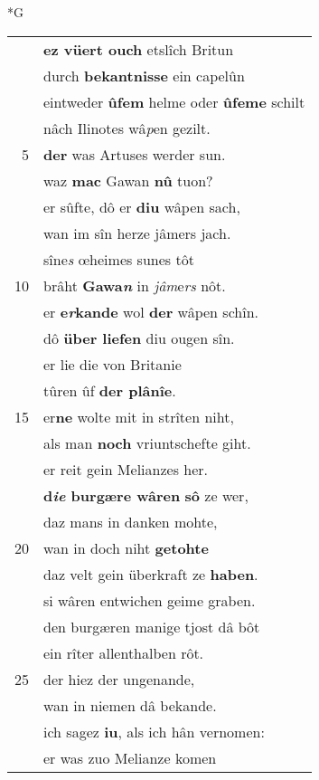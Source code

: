 \documentclass[8pt,a4paper,notitlepage]{article}
\begin{document}
\newpage
\begin{table}[ht]
\begin{minipage}[t]{0.5\linewidth}
\small
\begin{center}*G
\end{center}
\begin{tabular}{rl}
 & \textbf{ez vüert ouch} etslîch Britun\\ 
 & durch \textbf{bekantnisse} ein capelûn\\ 
 & eintweder \textbf{ûfem} helme oder \textbf{ûfeme} schilt\\ 
 & nâch Ilinotes wâ\textit{p}en gezilt.\\ 
5 & \textbf{der} was Artuses werder sun.\\ 
 & waz \textbf{mac} Gawan \textbf{nû} tuon?\\ 
 & er sûfte, dô er \textbf{diu} wâpen sach,\\ 
 & wan im sîn herze jâmers jach.\\ 
 & sîne\textit{s} œheimes sunes tôt\\ 
10 & brâht \textbf{Gawa\textit{n}} in \textit{jâm}e\textit{rs} nôt.\\ 
 & er \textbf{e\textit{r}kande} wol \textbf{der} wâpen schîn.\\ 
 & dô \textbf{über liefen} diu ougen sîn.\\ 
 & er lie die von Britanie\\ 
 & tûren ûf \textbf{der plânîe}.\\ 
15 & er\textbf{ne} wolte mit in strîten niht,\\ 
 & als man \textbf{noch} vriuntschefte giht.\\ 
 & er reit gein Melianzes her.\\ 
 & \textbf{d\textit{ie} burgære wâren} \textbf{sô} ze wer,\\ 
 & daz mans in danken mohte,\\ 
20 & wan in doch niht \textbf{getohte}\\ 
 & daz velt gein überkraft ze \textbf{haben}.\\ 
 & si wâren entwichen geime graben.\\ 
 & den burgæren manige tjost dâ bôt\\ 
 & ein rîter allenthalben rôt.\\ 
25 & der hiez der ungenande,\\ 
 & wan in niemen dâ bekande.\\ 
 & ich sagez \textbf{iu}, als ich hân vernomen:\\ 
 & er was zuo Melianze komen\\ 

\end{tabular}
\end{minipage}
\end{table}
\end{document}
